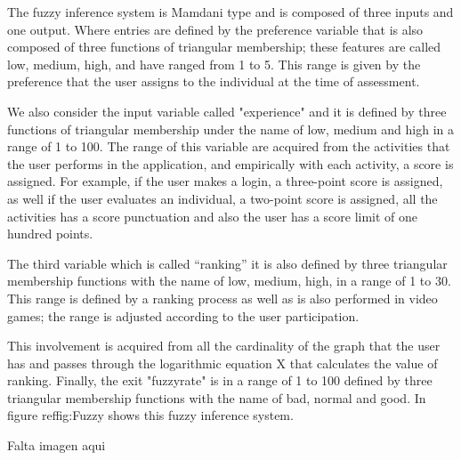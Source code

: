 The fuzzy inference system is Mamdani type and is composed of three inputs and one output. Where entries are defined by the preference variable that is also composed of three functions of triangular membership; these features are called low, medium, high, and have ranged from 1 to 5. This range is given by the preference that the user assigns to the individual at the time of assessment.

We also consider the input variable called "experience" and it is defined by three functions of triangular membership under the name of low, medium and high in a range of 1 to 100. The range of this variable are acquired from the activities that the user performs in the application, and empirically with each activity, a score is assigned. For example, if the user makes a login, a three-point score is assigned, as well if the user evaluates an individual, a two-point score is assigned, all the activities has a score punctuation and also the user has a score limit of one hundred points.

The third variable which is called “ranking” it is also defined by three triangular membership functions with the name of low, medium, high, in a range of 1 to 30. This range is defined by a ranking process as well as is also performed in video games; the range is adjusted according to the user participation.

This involvement is acquired from all the cardinality of the graph that the user has and passes through the logarithmic equation X that calculates the value of ranking. Finally, the exit "fuzzyrate" is in a range of 1 to 100 defined by three triangular membership functions with the name of bad, normal and good. In figure ref{fig:Fuzzy} shows this fuzzy inference system.

Falta imagen aqui

